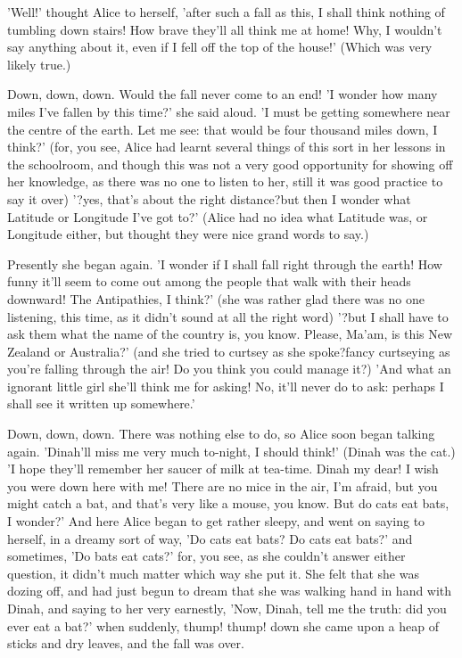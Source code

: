 \documentclass[landscape]{book}
\begin{document}
'Well!' thought Alice to herself, 'after such a fall as this, I shall think nothing of tumbling down stairs! How brave they'll all think me at home! Why, I wouldn't say anything about it, even if I fell off the top of the house!' (Which was very likely true.)

Down, down, down. Would the fall never come to an end! 'I wonder how many miles I've fallen by this time?' she said aloud. 'I must be getting somewhere near the centre of the earth. Let me see: that would be four thousand miles down, I think?' (for, you see, Alice had learnt several things of this sort in her lessons in the schoolroom, and though this was not a very good opportunity for showing off her knowledge, as there was no one to listen to her, still it was good practice to say it over) '?yes, that's about the right distance?but then I wonder what Latitude or Longitude I've got to?' (Alice had no idea what Latitude was, or Longitude either, but thought they were nice grand words to say.)

Presently she began again. 'I wonder if I shall fall right through the earth! How funny it'll seem to come out among the people that walk with their heads downward! The Antipathies, I think?' (she was rather glad there was no one listening, this time, as it didn't sound at all the right word) '?but I shall have to ask them what the name of the country is, you know. Please, Ma'am, is this New Zealand or Australia?' (and she tried to curtsey as she spoke?fancy curtseying as you're falling through the air! Do you think you could manage it?) 'And what an ignorant little girl she'll think me for asking! No, it'll never do to ask: perhaps I shall see it written up somewhere.'

Down, down, down. There was nothing else to do, so Alice soon began talking again. 'Dinah'll miss me very much to-night, I should think!' (Dinah was the cat.) 'I hope they'll remember her saucer of milk at tea-time. Dinah my dear! I wish you were down here with me! There are no mice in the air, I'm afraid, but you might catch a bat, and that's very like a mouse, you know. But do cats eat bats, I wonder?' And here Alice began to get rather sleepy, and went on saying to herself, in a dreamy sort of way, 'Do cats eat bats? Do cats eat bats?' and sometimes, 'Do bats eat cats?' for, you see, as she couldn't answer either question, it didn't much matter which way she put it. She felt that she was dozing off, and had just begun to dream that she was walking hand in hand with Dinah, and saying to her very earnestly, 'Now, Dinah, tell me the truth: did you ever eat a bat?' when suddenly, thump! thump! down she came upon a heap of sticks and dry leaves, and the fall was over.
\end{document}
